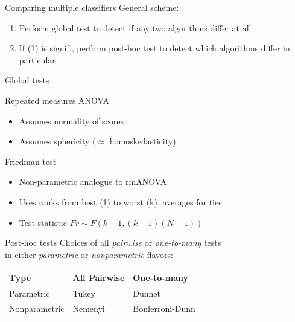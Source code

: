 \documentclass[aspectratio=169,12pt]{beamer}
\providecommand{\tightlist}{%
  \setlength{\itemsep}{2pt}\setlength{\parskip}{0pt}}
\begin{document}
\begin{frame}{Comparing multiple classifiers}
\label{comparing-multiple-classifiers}
General scheme:

\begin{enumerate}
\tightlist
\item
  Perform global test to detect if any two algorithms differ at all
\item
  If (1) is signif., perform post-hoc test to detect which algorithms
  differ in particular
\end{enumerate}
\end{frame}

\begin{frame}{Global tests}
\label{global-tests}
\begin{block}{Repeated measures ANOVA}
\label{repeated-measures-anova}
\begin{itemize}
\tightlist
\item
  Assumes normality of scores
\item
  Assumes sphericity (\(\approx\) homoskedasticity)
\end{itemize}
\end{block}

\begin{block}{Friedman test}
\label{friedman-test}
\begin{itemize}
\tightlist
\item
  Non-parametric analogue to rmANOVA
\item
  Uses ranks from best (1) to worst (k), averages for ties
\item
  Test statistic \(Fr \sim F(k-1, (k-1)(N-1))\)
\end{itemize}
\end{block}
\end{frame}

\begin{frame}{Post-hoc tests}
\label{post-hoc-tests}
Choices of all \emph{pairwise} or \emph{one-to-many} tests\\
in either \emph{parametric} or \emph{nonparametric} flavors:

\vfill

\begin{table}
\centering
\begin{tabular}{lll}
\toprule
Type & All Pairwise & One-to-many\\
\midrule
Parametric & Tukey & Dunnet\\
Nonparametric & Nemenyi & Bonferroni-Dunn\\
\bottomrule
\end{tabular}
\end{table}
\end{frame}
\end{document}
